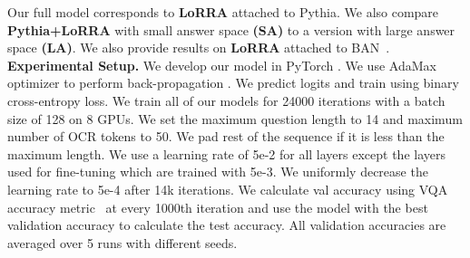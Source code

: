 \documentclass[10pt,twocolumn,letterpaper]{article}
\begin{document}
Our full model corresponds to \textbf{LoRRA} attached to Pythia. We also compare \textbf{Pythia+LoRRA}  with small answer space \textbf{(SA)} to a version with large answer space \textbf{(LA)}. We also provide results on \textbf{LoRRA} attached to BAN~\cite{kim2018bilinear}.
\\

\noindent\textbf{Experimental Setup.}
\label{subsec:setup}
We develop our model in PyTorch \cite{paszke2017automatic}. We use AdaMax optimizer \cite{kingma2014adam} to perform back-propagation \cite{lecun1989backpropagation}. We predict logits and train using binary cross-entropy loss. We train all of our models for 24000 iterations with a batch size of 128 on 8 GPUs. We set the maximum question length to 14 and maximum number of OCR tokens to 50. We pad rest of the sequence if it is less than the maximum length. 
We use a learning rate of 5e-2 for all layers except the  layers used for fine-tuning which are trained with 5e-3. We uniformly decrease the learning rate to 5e-4 after 14k iterations. We calculate val accuracy using VQA accuracy metric~\cite{balanced_vqa_v2} at every 1000th iteration and use the model with the best validation accuracy to calculate the test accuracy. All validation accuracies are averaged over 5 runs with different seeds.
\\
\end{document}
